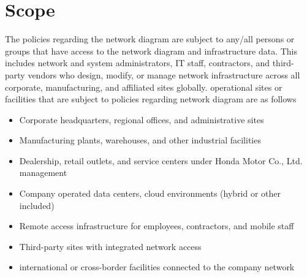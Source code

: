 \section{Scope}
The policies regarding the network diagram are subject to any/all persons or groups that have access to the network diagram and infrastructure data. This includes network and system administrators, IT staff, contractors, and third-party vendors who design, modify, or manage network infrastructure across all corporate, manufacturing, and affiliated sites globally. operational sites or facilities that are subject to policies regarding network diagram are as follows
\begin{itemize}
    \item Corporate headquarters, regional offices, and administrative sites
    \item Manufacturing plants, warehouses, and other industrial facilities
    \item Dealership, retail outlets, and service centers under Honda Motor Co., Ltd. management
    \item Company operated data centers, cloud environments (hybrid or other included)
    \item Remote access infrastructure for employees, contractors, and mobile staff
    \item Third-party sites with integrated network access
    \item international or cross-border facilities connected to the company network
\end{itemize}

